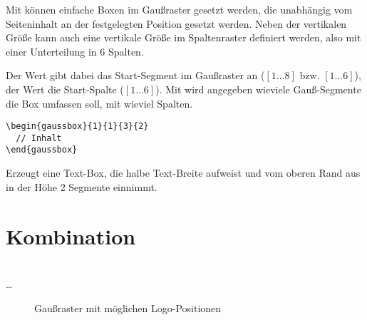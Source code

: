 Mit  können einfache Boxen im Gaußraster gesetzt werden,
die unabhängig vom Seiteninhalt an der festgelegten Position gesetzt werden.
Neben der vertikalen Größe kann auch eine vertikale Größe im Spaltenraster
definiert werden, also mit einer Unterteilung in 6 Spalten.

Der Wert  gibt dabei das Start-Segment im Gaußraster an
($[1\ldots 8]$ bzw. $[1\ldots6]$),
der Wert  die Start-Spalte ($[1\ldots6]$).
Mit  wird angegeben wieviele Gauß-Segmente die Box umfassen soll,
mit  wieviel Spalten.

\begin{Example}
  \begin{lstlisting}
\begin{gaussbox}{1}{1}{3}{2}
  // Inhalt
\end{gaussbox}
  \end{lstlisting}
  Erzeugt eine Text-Box, die halbe Text-Breite aufweist und vom oberen
  Rand aus in der Höhe 2 Segmente einnimmt.
\end{Example}


\section{Kombination}

\begin{Declaration}
    \\
  \quad\dots\\
\end{Declaration}


\begin{figure}\centering
  \begin{minipage}{0.35\textwidth}
    \label{fig:gausspage:topsender}
  \end{minipage}
  \quad
  \begin{minipage}{0.35\textwidth}
    \label{fig:gausspage:bottomsender}
  \end{minipage}
  \caption{Gaußraster mit möglichen Logo-Positionen}\label{fig:gausspage}
\end{figure}




\begin{Declaration}
\end{Declaration}

